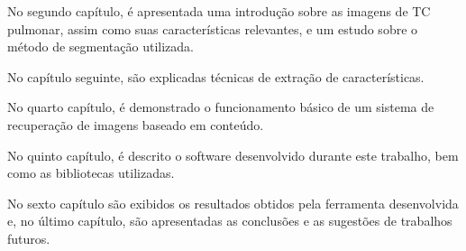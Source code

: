 No segundo capítulo, é apresentada uma introdução sobre as imagens de TC pulmonar, assim como suas características relevantes, e um estudo sobre o método de segmentação utilizada.

No capítulo seguinte, são explicadas técnicas de extração de características.

No quarto capítulo, é demonstrado o funcionamento básico de um sistema de recuperação de imagens baseado em conteúdo.

No quinto capítulo, é descrito o software desenvolvido durante este trabalho, bem como as bibliotecas utilizadas.

No sexto capítulo são exibidos os resultados obtidos pela ferramenta desenvolvida e, no último capítulo, são apresentadas as conclusões e as sugestões de trabalhos futuros.
